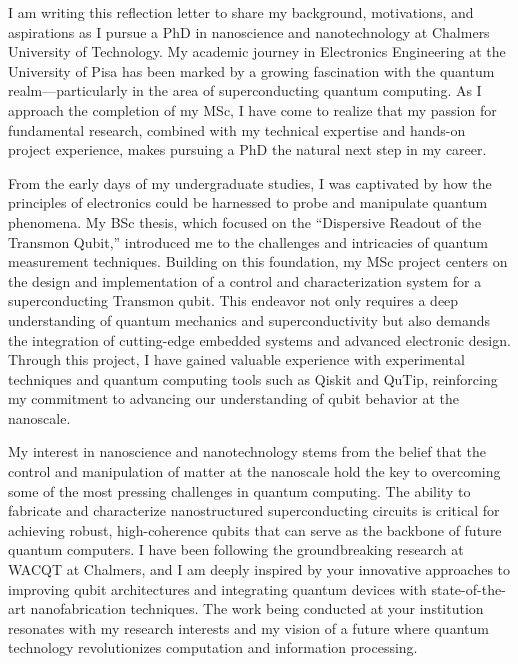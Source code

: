 \documentclass[10pt,stdletter,dateno]{newlfm}
\begin{document}
    \begin{newlfm}
        
        I am writing this reflection letter to share my background, motivations, and aspirations as I pursue a PhD in nanoscience and nanotechnology at Chalmers University of Technology. My academic journey in Electronics Engineering at the University of Pisa has been marked by a growing fascination with the quantum realm—particularly in the area of superconducting quantum computing. As I approach the completion of my MSc, I have come to realize that my passion for fundamental research, combined with my technical expertise and hands-on project experience, makes pursuing a PhD the natural next step in my career.
        
        From the early days of my undergraduate studies, I was captivated by how the principles of electronics could be harnessed to probe and manipulate quantum phenomena. My BSc thesis, which focused on the “Dispersive Readout of the Transmon Qubit,” introduced me to the challenges and intricacies of quantum measurement techniques. Building on this foundation, my MSc project centers on the design and implementation of a control and characterization system for a superconducting Transmon qubit. This endeavor not only requires a deep understanding of quantum mechanics and superconductivity but also demands the integration of cutting-edge embedded systems and advanced electronic design. Through this project, I have gained valuable experience with experimental techniques and quantum computing tools such as Qiskit and QuTip, reinforcing my commitment to advancing our understanding of qubit behavior at the nanoscale.
        
        My interest in nanoscience and nanotechnology stems from the belief that the control and manipulation of matter at the nanoscale hold the key to overcoming some of the most pressing challenges in quantum computing. The ability to fabricate and characterize nanostructured superconducting circuits is critical for achieving robust, high-coherence qubits that can serve as the backbone of future quantum computers. I have been following the groundbreaking research at WACQT at Chalmers, and I am deeply inspired by your innovative approaches to improving qubit architectures and integrating quantum devices with state-of-the-art nanofabrication techniques. The work being conducted at your institution resonates with my research interests and my vision of a future where quantum technology revolutionizes computation and information processing.
        

\end{newlfm}
\end{document}
